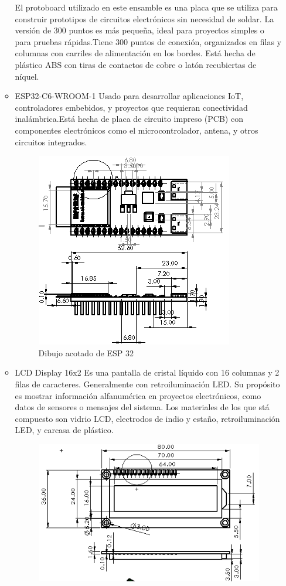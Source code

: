 \begin{itemize}
\begin{itemize}
     El protoboard utilizado en este ensamble es una placa que se utiliza para construir prototipos de circuitos electrónicos sin necesidad de soldar. La versión de 300 puntos es más pequeña, ideal para proyectos simples o para pruebas rápidas.Tiene 300 puntos de conexión, organizados en filas y columnas con carriles de alimentación en los bordes. Está  hecha de plástico ABS con tiras de contactos de cobre o latón recubiertas de níquel.
    \item ESP32-C6-WROOM-1
    Usado para desarrollar aplicaciones IoT, controladores embebidos, y proyectos que requieran conectividad inalámbrica.Está hecha de placa de circuito impreso (PCB) con componentes electrónicos como el microcontrolador, antena, y otros circuitos integrados.
    \begin{figure}[H]
        \centering
        \includegraphics[scale=0.9]{32/img/esp32Cotas.PNG}
        \caption{Dibujo acotado de ESP 32}
        \label{fig:enter-label}
    \end{figure}
    \item LCD Display 16x2 
    Es una pantalla de cristal líquido con 16 columnas y 2 filas de caracteres. Generalmente con retroiluminación LED. Su propósito es mostrar información alfanumérica en proyectos electrónicos, como datos de sensores o mensajes del sistema. Los materiales de los que stá compuesto son vidrio LCD, electrodos de indio y estaño, retroiluminación LED, y carcasa de plástico.
    \begin{figure}[H]
        \centering
        \includegraphics[scale=0.7]{32/img/lcdCotas.PNG}

\end{figure}
\end{itemize}
\end{itemize}
